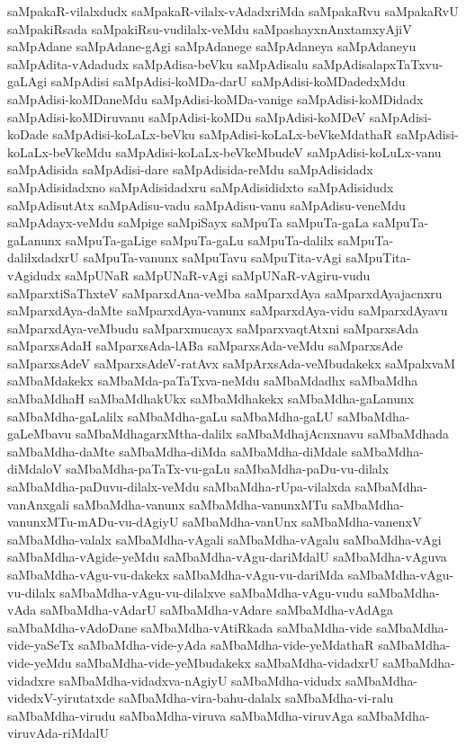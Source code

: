 {saMpakaR-vilalxdudx
saMpakaR-vilalx-vAdadxriMda
saMpakaRvu
saMpakaRvU
saMpakiRsada
saMpakiRsu-vudilalx-veMdu
saMpashayxnAnxtamxyAjiV
saMpAdane
saMpAdane-gAgi
saMpAdanege
saMpAdaneya
saMpAdaneyu
saMpAdita-vAdadudx
saMpAdisa-beVku
saMpAdisalu
saMpAdisalapxTaTxvu-gaLAgi
saMpAdisi
saMpAdisi-koMDa-darU
saMpAdisi-koMDadedxMdu
saMpAdisi-koMDaneMdu
saMpAdisi-koMDa-vanige
saMpAdisi-koMDidadx
saMpAdisi-koMDiruvanu
saMpAdisi-koMDu
saMpAdisi-koMDeV
saMpAdisi-koDade
saMpAdisi-koLaLx-beVku
saMpAdisi-koLaLx-beVkeMdathaR
saMpAdisi-koLaLx-beVkeMdu
saMpAdisi-koLaLx-beVkeMbudeV
saMpAdisi-koLuLx-vanu
saMpAdisida
saMpAdisi-dare
saMpAdisida-reMdu
saMpAdisidadx
saMpAdisidadxno
saMpAdisidadxru
saMpAdisididxto
saMpAdisidudx
saMpAdisutAtx
saMpAdisu-vadu
saMpAdisu-vanu
saMpAdisu-veneMdu
saMpAdayx-veMdu
saMpige
saMpiSayx
saMpuTa
saMpuTa-gaLa
saMpuTa-gaLanunx
saMpuTa-gaLige
saMpuTa-gaLu
saMpuTa-dalilx
saMpuTa-dalilxdadxrU
saMpuTa-vanunx
saMpuTavu
saMpuTita-vAgi
saMpuTita-vAgidudx
saMpUNaR
saMpUNaR-vAgi
saMpUNaR-vAgiru-vudu
saMparxtiSaThxteV
saMparxdAna-veMba
saMparxdAya
saMparxdAyajacnxru
saMparxdAya-daMte
saMparxdAya-vanunx
saMparxdAya-vidu
saMparxdAyavu
saMparxdAya-veMbudu
saMparxmucayx
saMparxvaqtAtxni
saMparxsAda
saMparxsAdaH
saMparxsAda-lABa
saMparxsAda-veMdu
saMparxsAde
saMparxsAdeV
saMparxsAdeV-ratAvx
saMpArxsAda-veMbudakekx
saMpalxvaM
saMbaMdakekx
saMbaMda-paTaTxva-neMdu
saMbaMdadhx
saMbaMdha
saMbaMdhaH
saMbaMdhakUkx
saMbaMdhakekx
saMbaMdha-gaLanunx
saMbaMdha-gaLalilx
saMbaMdha-gaLu
saMbaMdha-gaLU
saMbaMdha-gaLeMbavu
saMbaMdhagarxMtha-dalilx
saMbaMdhajAcnxnavu
saMbaMdhada
saMbaMdha-daMte
saMbaMdha-diMda
saMbaMdha-diMdale
saMbaMdha-diMdaloV
saMbaMdha-paTaTx-vu-gaLu
saMbaMdha-paDu-vu-dilalx
saMbaMdha-paDuvu-dilalx-veMdu
saMbaMdha-rUpa-vilalxda
saMbaMdha-vanAnxgali
saMbaMdha-vanunx
saMbaMdha-vanunxMTu
saMbaMdha-vanunxMTu-mADu-vu-dAgiyU
saMbaMdha-vanUnx
saMbaMdha-vanenxV
saMbaMdha-valalx
saMbaMdha-vAgali
saMbaMdha-vAgalu
saMbaMdha-vAgi
saMbaMdha-vAgide-yeMdu
saMbaMdha-vAgu-dariMdalU
saMbaMdha-vAguva
saMbaMdha-vAgu-vu-dakekx
saMbaMdha-vAgu-vu-dariMda
saMbaMdha-vAgu-vu-dilalx
saMbaMdha-vAgu-vu-dilalxve
saMbaMdha-vAgu-vudu
saMbaMdha-vAda
saMbaMdha-vAdarU
saMbaMdha-vAdare
saMbaMdha-vAdAga
saMbaMdha-vAdoDane
saMbaMdha-vAtiRkada
saMbaMdha-vide
saMbaMdha-vide-yaSeTx
saMbaMdha-vide-yAda
saMbaMdha-vide-yeMdathaR
saMbaMdha-vide-yeMdu
saMbaMdha-vide-yeMbudakekx
saMbaMdha-vidadxrU
saMbaMdha-vidadxre
saMbaMdha-vidadxva-nAgiyU
saMbaMdha-vidudx
saMbaMdha-videdxV-yirutatxde
saMbaMdha-vira-bahu-dalalx
saMbaMdha-vi-ralu
saMbaMdha-virudu
saMbaMdha-viruva
saMbaMdha-viruvAga
saMbaMdha-viruvAda-riMdalU
}
